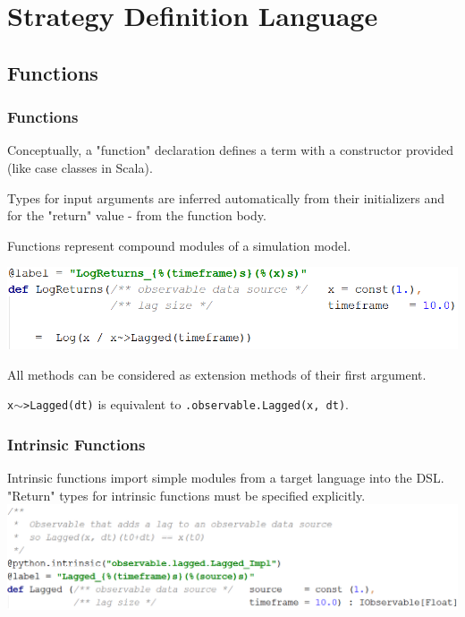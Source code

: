 \documentclass{beamer}
\begin{document}
\section{Strategy Definition Language}
\subsection{Functions}
\begin{frame}
\frametitle{Functions}
Conceptually, a "function" declaration defines a term with a constructor provided (like case classes in Scala). 

Types for input arguments are inferred automatically from their initializers and for the "return" value - from the function body.

Functions represent compound modules of a simulation model.

\includegraphics[width=1\linewidth]{logreturns.png}

All methods can be considered as extension methods of their first argument. 

\texttt{x$\sim$>Lagged(dt)} is equivalent to \texttt{.observable.Lagged(x, dt)}.
\end{frame}
\begin{frame}
\frametitle{Intrinsic Functions}
Intrinsic functions import simple modules from a target language into the DSL. 
"Return" types for intrinsic functions must be specified explicitly.
\includegraphics[width=1\linewidth]{lagged.png}
\end{frame}
\end{document}
